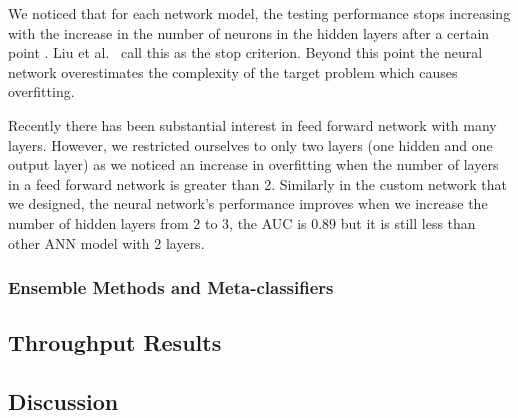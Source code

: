 We noticed that for each network model, the testing performance stops increasing with the increase in the number of neurons in the hidden layers after a certain point . Liu et al.~\cite{NN-Result} call this as the stop criterion. Beyond this point the neural network overestimates the complexity of the target problem which causes overfitting.

Recently there has been substantial interest in feed forward network with many layers. However, we restricted ourselves to only two layers (one hidden and one output layer) as we noticed an increase in overfitting when the number of layers in a feed forward network is greater than 2.  Similarly in the custom network that we designed, the neural network's performance improves when we increase the number of hidden layers from 2 to 3, the AUC is 0.89 but it is still less than other ANN model with 2 layers. 


\subsubsection{Ensemble Methods and Meta-classifiers}

\subsection{Throughput Results}



\subsection{Discussion}

